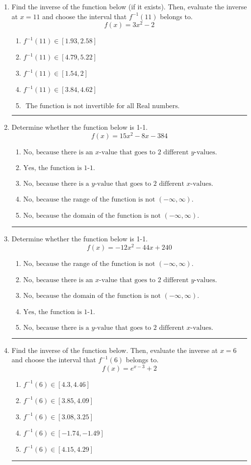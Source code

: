 \documentclass[14pt]{extbook}
\newcommand{\litem}[1]{\item#1\hspace*{-1cm}\rule{\textwidth}{0.4pt}}
\begin{document}
\begin{enumerate}
\litem{
Find the inverse of the function below (if it exists). Then, evaluate the inverse at $x = 11$ and choose the interval that $f^{-1}(11)$ belongs to.\[ f(x) = 3 x^2 - 2 \]\begin{enumerate}[label=\Alph*.]
\item \( f^{-1}(11) \in [1.93, 2.58] \)
\item \( f^{-1}(11) \in [4.79, 5.22] \)
\item \( f^{-1}(11) \in [1.54, 2] \)
\item \( f^{-1}(11) \in [3.84, 4.62] \)
\item \( \text{ The function is not invertible for all Real numbers. } \)

\end{enumerate} }
\litem{
Determine whether the function below is 1-1.\[ f(x) = 15 x^2 - 8 x - 384 \]\begin{enumerate}[label=\Alph*.]
\item \( \text{No, because there is an $x$-value that goes to 2 different $y$-values.} \)
\item \( \text{Yes, the function is 1-1.} \)
\item \( \text{No, because there is a $y$-value that goes to 2 different $x$-values.} \)
\item \( \text{No, because the range of the function is not $(-\infty, \infty)$.} \)
\item \( \text{No, because the domain of the function is not $(-\infty, \infty)$.} \)

\end{enumerate} }
\litem{
Determine whether the function below is 1-1.\[ f(x) = -12 x^2 - 44 x + 240 \]\begin{enumerate}[label=\Alph*.]
\item \( \text{No, because the range of the function is not $(-\infty, \infty)$.} \)
\item \( \text{No, because there is an $x$-value that goes to 2 different $y$-values.} \)
\item \( \text{No, because the domain of the function is not $(-\infty, \infty)$.} \)
\item \( \text{Yes, the function is 1-1.} \)
\item \( \text{No, because there is a $y$-value that goes to 2 different $x$-values.} \)

\end{enumerate} }
\litem{
Find the inverse of the function below. Then, evaluate the inverse at $x = 6$ and choose the interval that $f^{-1}(6)$ belongs to.\[ f(x) = e^{x-3}+2 \]\begin{enumerate}[label=\Alph*.]
\item \( f^{-1}(6) \in [4.3, 4.46] \)
\item \( f^{-1}(6) \in [3.85, 4.09] \)
\item \( f^{-1}(6) \in [3.08, 3.25] \)
\item \( f^{-1}(6) \in [-1.74, -1.49] \)
\item \( f^{-1}(6) \in [4.15, 4.29] \)


\end{enumerate}}
\end{enumerate}
\end{document}
